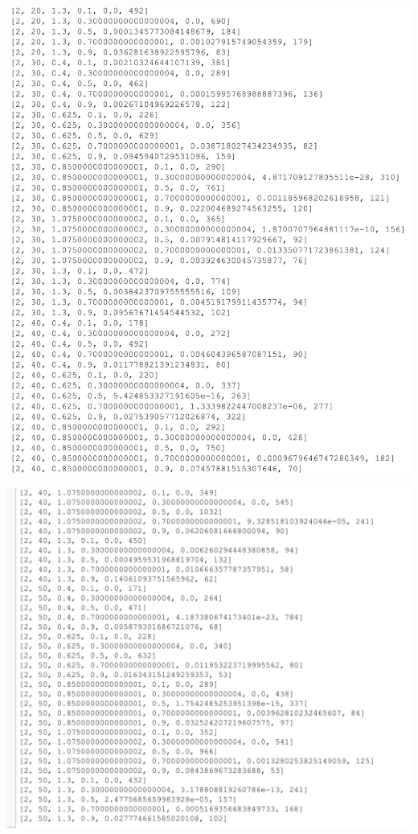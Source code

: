 \documentclass[10pt,a4paper]{article}
\begin{document}
	\includegraphics[width= \textwidth, keepaspectratio]{img/9}
	
	\includegraphics[width= \textwidth, keepaspectratio]{img/10}
	
\end{document}

